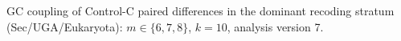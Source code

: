 GC coupling of Control-C paired differences in the dominant recoding stratum (Sec/UGA/Eukaryota): $m\in\{6,7,8\}$, $k=10$, analysis version 7.
